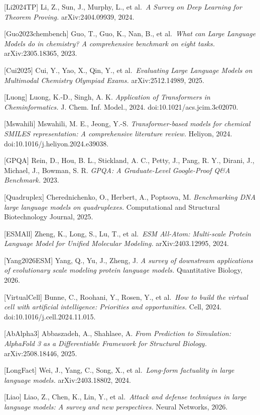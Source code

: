 {[}Li2024TP{]} Li, Z., Sun, J., Murphy, L., et al.~\emph{A Survey on Deep Learning for Theorem Proving.} arXiv:2404.09939, 2024.

{[}Guo2023chembench{]} Guo, T., Guo, K., Nan, B., et al.~\emph{What can Large Language Models do in chemistry? A comprehensive benchmark on eight tasks.} arXiv:2305.18365, 2023.

{[}Cui2025{]} Cui, Y., Yao, X., Qin, Y., et al.~\emph{Evaluating Large Language Models on Multimodal Chemistry Olympiad Exams.} arXiv:2512.14989, 2025.

{[}Luong{]} Luong, K.-D., Singh, A. K. \emph{Application of Transformers in Cheminformatics.} J. Chem. Inf. Model., 2024. doi:10.1021/acs.jcim.3c02070.

{[}Mswahili{]} Mswahili, M. E., Jeong, Y.-S. \emph{Transformer-based models for chemical SMILES representation: A comprehensive literature review.} Heliyon, 2024. doi:10.1016/j.heliyon.2024.e39038.

{[}GPQA{]} Rein, D., Hou, B. L., Stickland, A. C., Petty, J., Pang, R. Y., Dirani, J., Michael, J., Bowman, S. R. \emph{GPQA: A Graduate-Level Google-Proof Q\&A Benchmark.} 2023.

{[}Quadruplex{]} Cherednichenko, O., Herbert, A., Poptsova, M. \emph{Benchmarking DNA large language models on quadruplexes.} Computational and Structural Biotechnology Journal, 2025.

{[}ESMAll{]} Zheng, K., Long, S., Lu, T., et al.~\emph{ESM All-Atom: Multi-scale Protein Language Model for Unified Molecular Modeling.} arXiv:2403.12995, 2024.

{[}Yang2026ESM{]} Yang, Q., Yu, J., Zheng, J. \emph{A survey of downstream applications of evolutionary scale modeling protein language models.} Quantitative Biology, 2026.

{[}VirtualCell{]} Bunne, C., Roohani, Y., Rosen, Y., et al.~\emph{How to build the virtual cell with artificial intelligence: Priorities and opportunities.} Cell, 2024. doi:10.1016/j.cell.2024.11.015.

{[}AbAlpha3{]} Abbaszadeh, A., Shahlaee, A. \emph{From Prediction to Simulation: AlphaFold 3 as a Differentiable Framework for Structural Biology.} arXiv:2508.18446, 2025.

{[}LongFact{]} Wei, J., Yang, C., Song, X., et al.~\emph{Long-form factuality in large language models.} arXiv:2403.18802, 2024.

{[}Liao{]} Liao, Z., Chen, K., Lin, Y., et al.~\emph{Attack and defense techniques in large language models: A survey and new perspectives.} Neural Networks, 2026.

